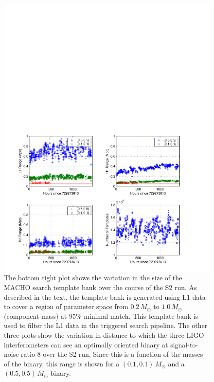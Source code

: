 \begin{figure}[p]
\begin{center}
\includegraphics[width=\linewidth]{figures/result/s2_macho_range_summary}
\end{center}
\caption[S2 Interferometer Ranges and Template Bank Size]{%
\label{f:inspiral_summary}%
The bottom right plot shows the variation in the size of the MACHO search
template bank over the course of the S2 run. As described in the text, the
template bank is generated using L1 data to cover a region of parameter space
from $0.2\,M_\odot$ to $1.0\,M_\odot$ (component mass) at $95\%$ minimal
match. This template bank is used to filter the L1 data in the triggered
search pipeline. The other three plots show the variation in distance to which
the three LIGO interferometers can see an optimally oriented binary at
signal-to-noise ratio 8 over the S2 run. Since this is a function of the
masses of the binary, this range is shown for a $(0.1,0.1)\,M_\odot$ and a
$(0.5,0.5)\,M_\odot$ binary.
}
\end{figure}

